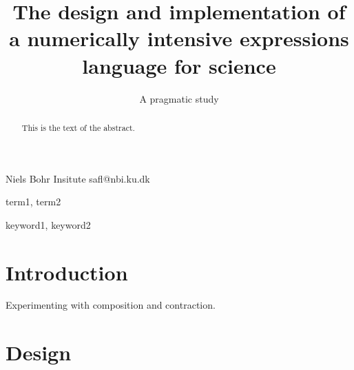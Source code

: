 \documentclass{sigplanconf}
\begin{document}
\setlength{\pdfpageheight}{\paperheight}
\setlength{\pdfpagewidth}{\paperwidth}






\title{The design and implementation of a numerically intensive expressions language for science}
\subtitle{A pragmatic study}

           {Niels Bohr Insitute}
           {safl@nbi.ku.dk}

\maketitle

\begin{abstract}
This is the text of the abstract.
\end{abstract}


\terms
term1, term2

\keywords
keyword1, keyword2

\section{Introduction}

Experimenting with composition and contraction.

\section{Design}
\end{document}
